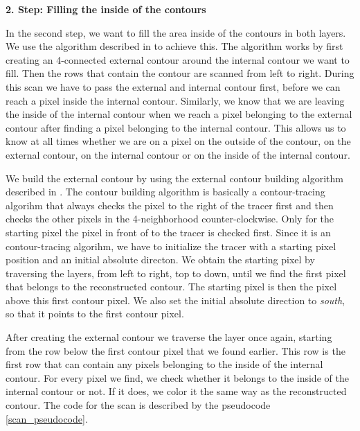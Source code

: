 \documentclass[thesis.tex]{subfiles}
\begin{document}
\textbf{2. Step: Filling the inside of the contours}

In the second step, we want to fill the area inside of the contours in both layers. We use the algorithm described in \cite{inside_contour} to achieve this. The algorithm works by first creating an 4-connected external contour around the internal contour we want to fill. Then the rows that contain the contour are scanned from left to right. During this scan we have to pass the external and internal contour first, before we can reach a pixel inside the internal contour. Similarly, we know that we are leaving the inside of the internal contour when we reach a pixel belonging to the external contour after finding a pixel belonging to the internal contour. This allows us to know at all times whether we are on a pixel on the outside of the contour, on the external contour, on the internal contour or on the inside of the internal contour.

We build the external contour by using the external contour building algorithm described in \cite{inside_contour}. The contour building algorithm is basically a contour-tracing algorihm that always checks the pixel to the right of the tracer first and then checks the other pixels in the 4-neighborhood counter-clockwise. Only for the starting pixel the pixel in front of to the tracer is checked first. Since it is an contour-tracing algorihm, we have to initialize the tracer with a starting pixel position and an initial absolute directon. We obtain the starting pixel by traversing the layers, from left to right, top to down, until we find the first pixel that belongs to the reconstructed contour. The starting pixel is then the pixel above this first contour pixel. We also set the initial absolute direction to \textit{south}, so that it points to the first contour pixel.

After creating the external contour we traverse the layer once again, starting from the row below the first contour pixel that we found earlier. This row is the first row that can contain any pixels belonging to the inside of the internal contour. For every pixel we find, we check whether it belongs to the inside of the internal contour or not. If it does, we color it the same way as the reconstructed contour. The code for the scan is described by the pseudocode \ref{scan_pseudocode}.
\end{document}

